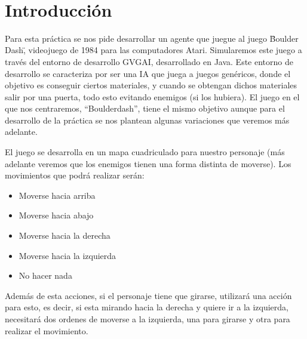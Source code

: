 \documentclass[10pt, spanish]{article}
\makeatletter
\let\thedate\@date
\makeatother
\begin{document}
\begin{titlepage}
    {\large \thedate}\\[0.5cm]
    {\doclicenseThis}
 	
    \vfill
    
\end{titlepage}




\section{Introducción}

Para esta práctica se nos pide desarrollar un agente que juegue al juego \"Boulder Dash\", videojuego de 1984 para las computadores Atari. Simularemos este juego a través del entorno de desarrollo GVGAI, desarrollado en Java. Este entorno de desarrollo se caracteriza por ser una IA que juega a juegos genéricos, donde el objetivo es conseguir ciertos materiales, y cuando se obtengan dichos materiales salir por una puerta, todo esto evitando enemigos (si los hubiera). El juego en el que nos centraremos, ``Boulderdash'', tiene el mismo objetivo aunque para el desarrollo de la práctica se nos plantean algunas variaciones que veremos más adelante.

El juego se desarrolla en un mapa cuadriculado para nuestro personaje (más adelante veremos que los enemigos tienen una forma distinta de moverse). Los movimientos que podrá realizar serán:

\begin{itemize}
	\item Moverse hacia arriba
	\item Moverse hacia abajo
	\item Moverse hacia la derecha
	\item Moverse hacia la izquierda
	\item No hacer nada
\end{itemize}

Además de esta acciones, si el personaje tiene que girarse, utilizará una acción para esto, es decir, si esta mirando hacia la derecha y quiere ir a la izquierda, necesitará dos ordenes de moverse a la izquierda, una para girarse y otra para realizar el movimiento.
\end{document}
